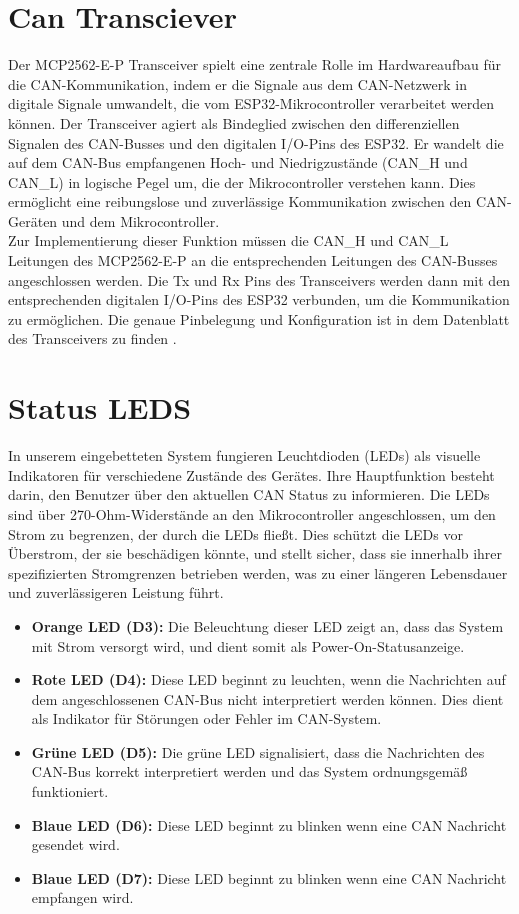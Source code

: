 \section{Can Transciever}
\noindent Der MCP2562-E-P Transceiver spielt eine zentrale Rolle im Hardwareaufbau für die CAN-Kommunikation, indem er die Signale aus dem CAN-Netzwerk in digitale Signale umwandelt, die vom ESP32-Mikrocontroller verarbeitet werden können. Der Transceiver agiert als Bindeglied zwischen den differenziellen Signalen des CAN-Busses und den digitalen I/O-Pins des ESP32. Er wandelt die auf dem CAN-Bus empfangenen Hoch- und Niedrigzustände (CAN\_H und CAN\_L) in logische Pegel um, die der Mikrocontroller verstehen kann. Dies ermöglicht eine reibungslose und zuverlässige Kommunikation zwischen den CAN-Geräten und dem Mikrocontroller.\\

\noindent Zur Implementierung dieser Funktion müssen die CAN\_H und CAN\_L Leitungen des MCP2562-E-P an die entsprechenden Leitungen des CAN-Busses angeschlossen werden. Die Tx und Rx Pins des Transceivers werden dann mit den entsprechenden digitalen I/O-Pins des ESP32 verbunden, um die Kommunikation zu ermöglichen. Die genaue Pinbelegung und Konfiguration ist in dem Datenblatt des Transceivers zu finden \cite{2}.\\

\section{Status LEDS}
In unserem eingebetteten System fungieren Leuchtdioden (LEDs) als visuelle Indikatoren für verschiedene Zustände des Gerätes. Ihre Hauptfunktion besteht darin, den Benutzer über den aktuellen CAN Status zu informieren. Die LEDs sind über 270-Ohm-Widerstände an den Mikrocontroller angeschlossen, um den Strom zu begrenzen, der durch die LEDs fließt. Dies schützt die LEDs vor Überstrom, der sie beschädigen könnte, und stellt sicher, dass sie innerhalb ihrer spezifizierten Stromgrenzen betrieben werden, was zu einer längeren Lebensdauer und zuverlässigeren Leistung führt.\\

\begin{itemize}
  \item \textbf{Orange LED (D3):} Die Beleuchtung dieser LED zeigt an, dass das System mit Strom versorgt wird, und dient somit als Power-On-Statusanzeige.
  \item \textbf{Rote   LED (D4):} Diese LED beginnt zu leuchten, wenn die Nachrichten auf dem angeschlossenen CAN-Bus nicht interpretiert werden können. Dies dient als Indikator für Störungen oder Fehler im CAN-System.
  \item \textbf{Grüne  LED (D5):} Die grüne LED signalisiert, dass die Nachrichten des CAN-Bus korrekt interpretiert werden und das System ordnungsgemäß funktioniert.
  \item \textbf{Blaue  LED (D6):} Diese LED beginnt zu blinken wenn eine CAN Nachricht gesendet wird.
  \item \textbf{Blaue  LED (D7):} Diese LED beginnt zu blinken wenn eine CAN Nachricht empfangen wird.
\end{itemize}

